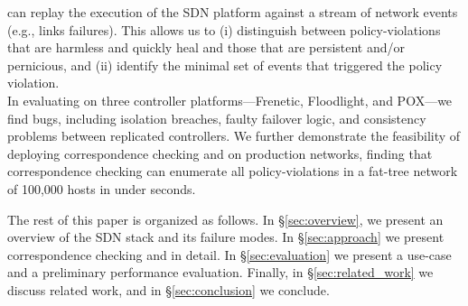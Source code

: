  \projectname{} can replay the execution of the SDN platform against
a stream of network events (e.g., links failures). This allows us to (i) distinguish between policy-violations that are harmless and quickly heal and those that are persistent and/or pernicious, and (ii) identify the minimal set of events that triggered
the policy violation. \\

In evaluating \projectname{} on
three controller platforms---Frenetic, Floodlight, and POX---we find  bugs,
including isolation breaches,
faulty failover logic, and consistency problems between replicated
controllers. We further demonstrate the feasibility of deploying
correspondence checking and \simulator{} on production networks,
finding that correspondence checking can enumerate all policy-violations in a
fat-tree network of 100,000 hosts in under  seconds.

The rest of this paper is organized as follows. In \S\ref{sec:overview},
we present an overview of the SDN stack and its failure modes.
In \S\ref{sec:approach} we present correspondence checking and
\simulator{} in detail. In \S\ref{sec:evaluation} we present
a use-case and a preliminary performance evaluation.
Finally, in \S\ref{sec:related_work} we discuss related work,
and in \S\ref{sec:conclusion} we conclude.

\subsection{}

